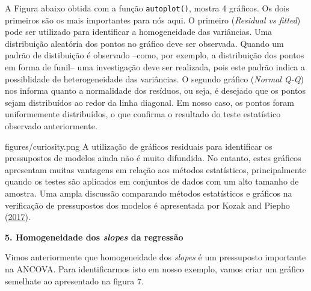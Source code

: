 \documentclass[
]{book}
\numberwithin{equation}{section}
\newcommand{\indt}[1]{\index{#1|ST}}
\newenvironment{vcsabia}
  {\begin{customBlockImage}[colframe=customGreen, title=Curiosidade]{figures/curiosity.png}}
  {\end{customBlockImage}}
\begin{document}
A Figura abaixo obtida com a função \texttt{autoplot()}, mostra 4 gráficos. Os dois primeiros são os mais importantes para nós aqui. O primeiro (\emph{Residual vs fitted}) pode ser utilizado para identificar a homogeneidade das variâncias. Uma distribuição aleatória dos pontos no gráfico deve ser observada. Quando um padrão de distibuição é observado --como, por exemplo, a distribuição dos pontos em forma de funil-- uma investigação deve ser realizada, pois este padrão indica a possiblidade de heterogeneidade das variâncias. O segundo gráfico (\emph{Normal Q-Q}) nos informa quanto a normalidade dos resíduos, ou seja, é desejado que os pontos sejam distribuídos ao redor da linha diagonal. Em nosso caso, os pontos foram uniformemente distribuídos, o que confirma o resultado do teste estatístico observado anteriormente.

\indt{Curiosidade}
\begin{vcsabia}
A utilização de gráficos residuais para identificar os pressupostos de modelos ainda não é muito difundida. No entanto, estes gráficos apresentam muitas vantagens em relação aos métodos estatísticos, principalmente quando os testes são aplicados em conjuntos de dados com um alto tamanho de amostra. Uma ampla discussão comparando métodos estatísticos e gráficos na verificação de pressupostos dos modelos é apresentada por Kozak and Piepho (\protect\hyperlink{ref-Kozak2017}{2017}).
\end{vcsabia}

\textbf{5. Homogeneidade dos \emph{slopes} da regressão}

Vimos anteriormente que homogeneidade dos \emph{slopes} é um pressuposto importante na ANCOVA. Para identificarmos isto em nosso exemplo, vamos criar um gráfico semelhate ao apresentado na figura 7.
\end{document}
